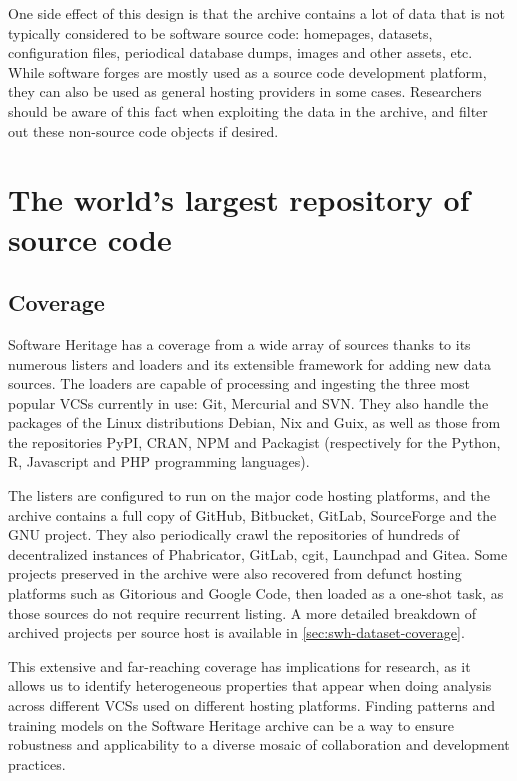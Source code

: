 One side effect of this design is that the archive contains a lot of data that
is not typically considered to be software source code: homepages, datasets,
configuration files, periodical database dumps, images and other assets, etc.
While software forges are mostly used as a source code development platform,
they can also be used as general hosting providers in some cases. Researchers
should be aware of this fact when exploiting the data in the archive, and
filter out these non-source code objects if desired.

\section{The world's largest repository of source code}

\subsection{Coverage}

Software Heritage has a coverage from a wide array of sources thanks to its
numerous listers and loaders and its extensible framework for adding new data
sources. The loaders are capable of processing and ingesting the three most
popular \glspl{VCS} currently in use: Git, Mercurial and SVN\@. They also handle
the packages of the Linux distributions Debian, Nix and Guix, as well as those
from the repositories PyPI, CRAN, NPM and Packagist (respectively for the
Python, R, Javascript and PHP programming languages).

The listers are configured to run on the major code hosting platforms, and the
archive contains a full copy of GitHub, Bitbucket, GitLab, SourceForge and the
GNU project. They also periodically crawl the repositories of hundreds of
decentralized instances of Phabricator, GitLab, cgit, Launchpad and Gitea.
Some projects preserved in the archive were also recovered from defunct
hosting platforms such as Gitorious and Google Code, then loaded as a one-shot
task, as those sources do not require recurrent listing. A more detailed
breakdown of archived projects per source host is available in
\cref{sec:swh-dataset-coverage}.

This extensive and far-reaching coverage has implications for research, as it
allows us to identify heterogeneous properties that appear when doing analysis
across different \glspl{VCS} used on different hosting platforms. Finding
patterns and training models on the Software Heritage archive can be a way to
ensure robustness and applicability to a diverse mosaic of collaboration and
development practices.


